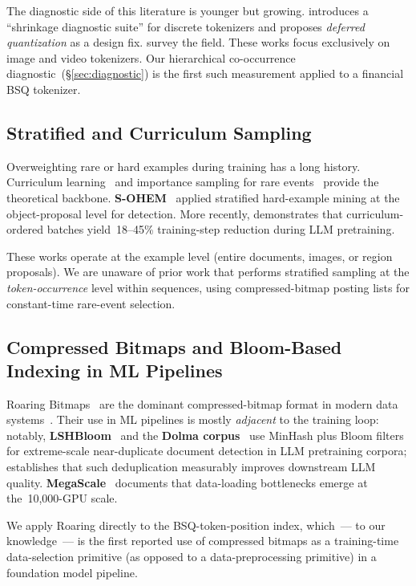 \documentclass[10pt]{article}
\begin{document}
The diagnostic side of this literature is younger but growing.
\citet{shrinks_codebook2026} introduces a ``shrinkage diagnostic
suite'' for discrete tokenizers and proposes \emph{deferred
quantization} as a design fix.
\citet{discrete_tokenization_survey2025} survey the
field. These works focus exclusively on image and video tokenizers.
Our hierarchical co-occurrence
diagnostic~(\S\ref{sec:diagnostic}) is the first such measurement
applied to a financial BSQ tokenizer.

\subsection{Stratified and Curriculum Sampling}

Overweighting rare or hard examples during training has a long
history. Curriculum learning~\citep{bengio2009curriculum} and
importance sampling for rare events~\citep{tail_risk2023} provide the
theoretical backbone. \textbf{S-OHEM}~\citep{sohem2017} applied
stratified hard-example mining at the object-proposal level for
detection. More recently, \citet{curriculum_llm2025} demonstrates
that curriculum-ordered batches yield~18--45\% training-step
reduction during LLM pretraining.

These works operate at the example level (entire documents, images,
or region proposals). We are unaware of prior work that performs
stratified sampling at the \emph{token-occurrence} level within
sequences, using compressed-bitmap posting lists for constant-time
rare-event selection.

\subsection{Compressed Bitmaps and Bloom-Based Indexing in ML Pipelines}

Roaring Bitmaps~\citep{roaring2016} are the dominant compressed-bitmap
format in modern data systems~\citep{druid}. Their use in ML
pipelines is mostly \emph{adjacent} to the training loop: notably,
\textbf{LSHBloom}~\citep{lshbloom2024} and the
\textbf{Dolma corpus}~\citep{dolma2024} use MinHash plus Bloom filters
for extreme-scale near-duplicate document detection in LLM
pretraining corpora; \citet{lee2022dedup} establishes that such
deduplication measurably improves downstream LLM
quality. \textbf{MegaScale}~\citep{megascale2024} documents that
data-loading bottlenecks emerge at the~10{,}000-GPU scale.

We apply Roaring directly to the BSQ-token-position index, which~--- to
our knowledge~--- is the first reported use of compressed bitmaps as
a training-time data-selection primitive (as opposed to a
data-preprocessing primitive) in a foundation model pipeline.
\end{document}
